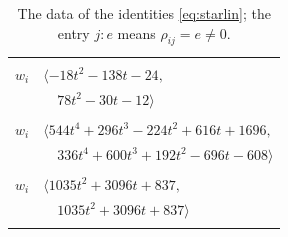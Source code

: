\documentclass[11pt]{article}
\begin{document}
\begingroup\scriptsize
\setlength{\LTcapwidth}{\textwidth}
\begin{longtable}{@{}ll@{}}
\caption{The data of the identities \eqref{eq:starlin}; the entry $j{:}e$ means $\rho_{ij}=e\neq0$.}\label{tab:star}\\
\hline\endfirsthead\hline\endhead\hline\endfoot
\multicolumn{2}{@{}p{0.97\textwidth}@{}}{$i=0$, $D_i=1$, $\rho_{ij}$: $9{:}2, \allowbreak 13{:}2, \allowbreak 16{:}2, \allowbreak 23{:}1, \allowbreak 31{:}3, \allowbreak 39{:}1, \allowbreak 41{:}1, \allowbreak 55{:}1, \allowbreak 67{:}1, \allowbreak 69{:}1, \allowbreak 73{:}2, \allowbreak 79{:}2$}\\
$w_i$ & $\langle -18t^{2}-138t-24,$\\
 & $\quad 78t^{2}-30t-12\rangle$\\
\addlinespace[2pt]
\multicolumn{2}{@{}p{0.97\textwidth}@{}}{$i=1$, $D_i=1$, $\rho_{ij}$: $14{:}1, \allowbreak 18{:}3, \allowbreak 22{:}2, \allowbreak 25{:}2, \allowbreak 26{:}1, \allowbreak 29{:}2, \allowbreak 31{:}3, \allowbreak 35{:}1, \allowbreak 37{:}2, \allowbreak 41{:}3, \allowbreak 48{:}3, \allowbreak 55{:}3, \allowbreak 61{:}1, \allowbreak 62{:}1, \allowbreak 66{:}3, \allowbreak 75{:}1, \allowbreak 77{:}3, \allowbreak 80{:}2$}\\
$w_i$ & $\langle 544t^{4}+296t^{3}-224t^{2}+616t+1696,$\\
 & $\quad 336t^{4}+600t^{3}+192t^{2}-696t-608\rangle$\\
\addlinespace[2pt]
\multicolumn{2}{@{}p{0.97\textwidth}@{}}{$i=2$, $D_i=1$, $\rho_{ij}$: $8{:}2, \allowbreak 12{:}2, \allowbreak 17{:}1, \allowbreak 18{:}3, \allowbreak 20{:}1, \allowbreak 21{:}3, \allowbreak 25{:}3, \allowbreak 26{:}3, \allowbreak 33{:}2, \allowbreak 34{:}2, \allowbreak 35{:}2, \allowbreak 38{:}2, \allowbreak 39{:}1, \allowbreak 45{:}3, \allowbreak 52{:}1, \allowbreak 62{:}2, \allowbreak 69{:}1, \allowbreak 71{:}1, \allowbreak 73{:}2, \allowbreak 75{:}3$}\\
$w_i$ & $\langle 1035t^{2}+3096t+837,$\\
 & $\quad 1035t^{2}+3096t+837\rangle$\\
\addlinespace[2pt]
\multicolumn{2}{@{}p{0.97\textwidth}@{}}{$i=3$, $D_i=1$, $\rho_{ij}$: $7{:}3, \allowbreak 9{:}1, \allowbreak 16{:}1, \allowbreak 25{:}1, \allowbreak 32{:}3, \allowbreak 34{:}1, \allowbreak 38{:}3, \allowbreak 40{:}1, \allowbreak 41{:}2, \allowbreak 54{:}1, \allowbreak 57{:}1, \allowbreak 58{:}3, \allowbreak 65{:}3, \allowbreak 68{:}2, \allowbreak 73{:}1, \allowbreak 74{:}2, \allowbreak 80{:}3$}\\

\end{longtable}
\end{document}
